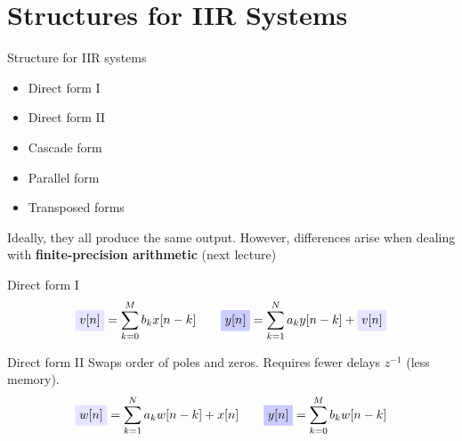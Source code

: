 \documentclass[10pt, handout]{beamer}
\begin{document}
\section{Structures for IIR Systems}
\begin{frame}{Structure for IIR systems}
	\begin{itemize}
		\item Direct form I
		\item Direct form II
		\item Cascade form
		\item Parallel form
		\item Transposed forms
	\end{itemize}

	Ideally, they all produce the same output. However, differences arise when dealing with \textbf{finite-precision arithmetic} (next lecture)
\end{frame}


\begin{frame}{Direct form I}
	\begin{equation*}
	\tikz[baseline]{\node[fill=blue!10,anchor=base] {$v[n]$};} = \sum_{k = 0}^{M}b_kx[n-k] \qquad \tikz[baseline]{\node[fill=blue!20,anchor=base] {$y[n]$};} = \sum_{k = 1}^{N}a_ky[n-k] + \tikz[baseline]{\node[fill=blue!10,anchor=base] {$v[n]$};}
	\end{equation*}
\begin{center}
		\resizebox{0.7\textwidth}{!}{}
\end{center}
\end{frame}

\begin{frame}{Direct form II}
	Swaps order of poles and zeros. Requires fewer delays $z^{-1}$ (less memory).
	\begin{equation*}
	\tikz[baseline]{\node[fill=blue!10,anchor=base] {$w[n]$};} = \sum_{k = 1}^{N}a_kw[n-k] + x[n] \qquad \tikz[baseline]{\node[fill=blue!20,anchor=base] {$y[n]$};} = \sum_{k = 0}^{M}b_kw[n-k]
	\end{equation*}
	\begin{center}
		\resizebox{0.55\textwidth}{!}{}
	\end{center}
\end{frame}
\end{document}
